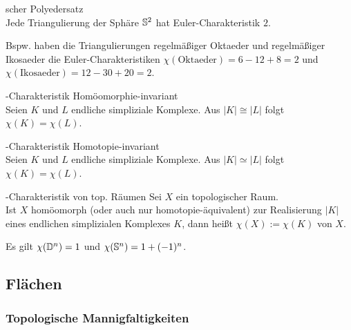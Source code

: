 \linie

\begin{Satz}{scher Polyedersatz}\\
    Jede Triangulierung der Sphäre $\mathbb{S}^2$ hat Euler-Charakteristik $2$.
\end{Satz}

\begin{Bsp}
    Bspw. haben die Triangulierungen regelmäßiger Oktaeder und
    regelmäßiger Ikosaeder die Euler-Charakteristiken
    $\chi(\text{Oktaeder}) = 6 - 12 + 8 = 2$ und
    $\chi(\text{Ikosaeder}) = 12 - 30 + 20 = 2$.
\end{Bsp}

\linie

\begin{Satz}{-Charakteristik Homöomorphie-invariant}\\
    Seien $K$ und $L$ endliche simpliziale Komplexe.
    Aus $|K| \cong |L|$ folgt $\chi(K) = \chi(L)$.
\end{Satz}

\begin{Satz}{-Charakteristik Homotopie-invariant}\\
    Seien $K$ und $L$ endliche simpliziale Komplexe.
    Aus $|K| \simeq |L|$ folgt $\chi(K) = \chi(L)$.
\end{Satz}

\begin{Def}{-Charakteristik von top. Räumen}
    Sei $X$ ein topologischer Raum. \\
    Ist $X$ homöomorph (oder auch nur homotopie-äquivalent) zur Realisierung
    $|K|$ eines endlichen simplizialen Komplexes $K$, dann heißt
    $\chi(X) := \chi(K)$  von $X$.
\end{Def}

\begin{Bsp}
    Es gilt $\chi(\mathbb{D}^n) = 1$ und $\chi(\mathbb{S}^n) = 1 + (-1)^n$.
\end{Bsp}

\pagebreak

\subsection{%
    Flächen%
}

\subsubsection{%
    Topologische Mannigfaltigkeiten%
}

